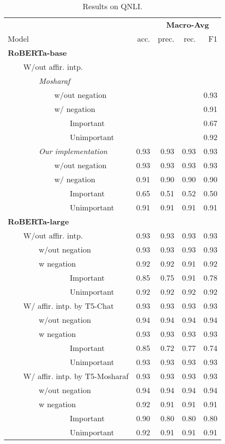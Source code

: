 

\begin{table*}
\centering
\begin{tabular}{lrrrr}
\toprule
&& \multicolumn{3}{c}{\textbf{Macro-Avg}} \\
Model & acc. & prec. & rec. & F1 \\
\midrule
\textbf{RoBERTa-base} \\
~~~~W/out affir. intp. \\
~~~~~~~~\textit{Mosharaf} \\
~~~~~~~~~~~~w/out negation &&&&0.93\\ 
~~~~~~~~~~~~w/ negation &&&&0.91\\ 
~~~~~~~~~~~~~~~~Important &&&&0.67\\ 
~~~~~~~~~~~~~~~~Unimportant &&&&0.92\\ 
\midrule
~~~~~~~~\textit{Our implementation}  & 0.93 & 0.93 & 0.93 & 0.93 \\ 
~~~~~~~~~~~~w/out negation  & 0.93 & 0.93 & 0.93 & 0.93 \\
~~~~~~~~~~~~w/ negation  & 0.91 & 0.90 & 0.90 & 0.90 \\
~~~~~~~~~~~~~~~~Important  & 0.65 & 0.51 & 0.52 & 0.50 \\  
~~~~~~~~~~~~~~~~Unimportant  & 0.91 & 0.91 & 0.91 & 0.91 \\ 
\bottomrule
\textbf{RoBERTa-large} \\
~~~~W/out affir. intp.  & 0.93 & 0.93 & 0.93 & 0.93 \\ 
~~~~~~~~w/out negation  & 0.93 & 0.93 & 0.93 & 0.93 \\ 
~~~~~~~~w negation  & 0.92 & 0.92 & 0.91 & 0.92 \\  
~~~~~~~~~~~~~~~~Important  & 0.85 & 0.75 & 0.91 & 0.78 \\ 
~~~~~~~~~~~~~~~~Unimportant  & 0.92 & 0.92 & 0.92 & 0.92 \\ 
\midrule
~~~~W/ affir. intp. by T5-Chat  & 0.93 & 0.93 & 0.93 & 0.93 \\
~~~~~~~~w/out negation  & 0.94 & 0.94 & 0.94 & 0.94 \\
~~~~~~~~w negation & 0.93 & 0.93 & 0.93 & 0.93 \\
~~~~~~~~~~~~~~~~Important & 0.85 & 0.72 & 0.77 & 0.74 \\
~~~~~~~~~~~~~~~~Unimportant & 0.93 & 0.93 & 0.93 & 0.93 \\
\midrule
~~~~W/ affir. intp. by T5-Mosharaf & 0.93 & 0.93 & 0.93 & 0.93 \\
~~~~~~~~w/out negation  & 0.94 & 0.94 & 0.94 & 0.94 \\
~~~~~~~~w negation  & 0.92 & 0.91 & 0.91 & 0.91 \\ 
~~~~~~~~~~~~~~~~Important  & 0.90 & 0.80 & 0.80 & 0.80 \\
~~~~~~~~~~~~~~~~Unimportant   & 0.92 & 0.91 & 0.91 & 0.91 \\ 
\bottomrule
\end{tabular}
\caption{Results on QNLI.}
\end{table*}